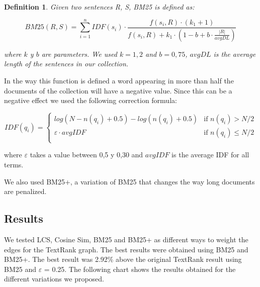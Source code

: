\documentclass{llncs}
\newtheorem{definicion}{Definition}
\begin{document}
\begin{definicion}
Given two sentences R, S, BM25 is defined as:

\begin{equation}
BM25(R,S) = \sum_{i=1}^{n} IDF(s_i) \cdot \frac{f(s_i, R) \cdot (k_1 + 1)}{f(s_i, R) + k_1 \cdot (1 - b + b \cdot \frac{|R|}{avgDL})}
\end{equation}

where $k$ y $b$ are parameters. We used $k = 1,2$ and $b = 0,75$,  $avgDL$ is the average length of the sentences in our collection.
\end{definicion}

In the way this function is defined a word appearing in more than half the documents of the collection will have a negative value. Since this can be a negative effect we used the following correction formula:
                
\begin{equation}
 IDF(q_i) =
  \begin{cases}
       log(N - n(q_i) + 0.5) - log(n(q_i) + 0.5)    & \text{if }  n(q_i) > N/2\\
       \varepsilon \cdot avgIDF                     & \text{if }  n(q_i) \leq N/2\\
  \end{cases}
\end{equation}                
                
where $\varepsilon$ takes a value between 0,5 y 0,30 and $avgIDF$ is the average IDF for all terms.

We also used BM25+, a variation of BM25 that changes the way long documents are penalized.

\subsection{Results}
We tested LCS, Cosine Sim, BM25 and BM25+ as different ways to weight the edges for the TextRank graph. 
The best results were obtained using BM25 and BM25+. The best result was 2.92\% above the original TextRank result using BM25 and $\varepsilon$ = 0.25. The following chart shows the results obtained for the different variations we proposed.
\end{document}
